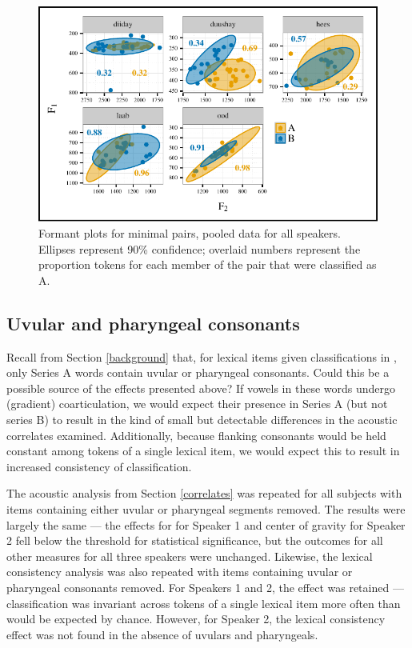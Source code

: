 \documentclass[output=paper
,newtxmath
,modfonts
,nonflat]{langsci/langscibook}
\begin{document}
\begin{figure}
\includegraphics[scale=1]{figures/notminimalpairs.pdf}
\caption{Formant plots for minimal pairs, pooled data for all speakers.  Ellipses represent 90\% confidence; overlaid numbers represent the proportion tokens for each member of the pair that were classified as A.}
\label{fig:kbgy:5}
\end{figure}

\subsection{Uvular and pharyngeal consonants}
\label{up}

Recall from Section \ref{background} that, for lexical items given classifications in \citet{Andrzejewski1955}, only Series A words contain uvular or pharyngeal consonants.  Could this be a possible source of the effects presented above?  If vowels in these words undergo (gradient) coarticulation, we would expect their presence in Series A (but not series B) to result in the kind of small but detectable differences in the acoustic correlates examined.  Additionally, because flanking consonants would be held constant among tokens of a single lexical item, we would expect this to result in increased consistency of classification.

The acoustic analysis from Section \ref{correlates} was repeated for all subjects with items containing either uvular or pharyngeal segments removed.  The results were largely the same --- the effects for  for Speaker 1 and center of gravity for Speaker 2 fell below the threshold for statistical significance, but the outcomes for all other measures for all three speakers were unchanged.  Likewise, the lexical consistency analysis was also repeated with items containing uvular or pharyngeal consonants removed.  For Speakers 1 and 2, the effect was retained --- classification was invariant across tokens of a single lexical item more  often than would be expected by chance.  However, for Speaker 2, the lexical consistency effect was not found in the absence of uvulars and pharyngeals.  
\end{document}
